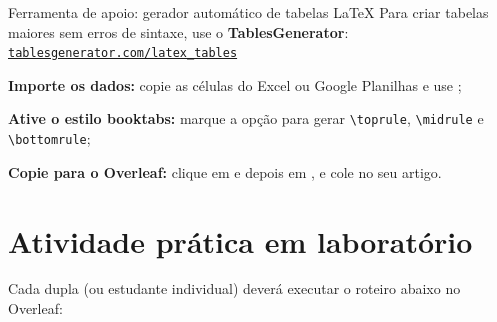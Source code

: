     \begin{dica}{Ferramenta de apoio: gerador automático de tabelas \LaTeX}
        Para criar tabelas maiores sem erros de sintaxe, use o \textbf{TablesGenerator}: \href{https://www.tablesgenerator.com/latex_tables}{\texttt{tablesgenerator.com/latex\_tables}}
        \begin{enumerate}[label={\protect\circulo[ambar]{\arabic*}}]
            \item \textbf{Importe os dados:} copie as células do Excel ou Google Planilhas e use \seta{};
            \item \textbf{Ative o estilo booktabs:} marque a opção  para gerar \texttt{\textbackslash toprule}, \texttt{\textbackslash midrule} e \texttt{\textbackslash bottomrule};
            \item \textbf{Copie para o Overleaf:} clique em  e depois em , e cole no seu artigo.
        \end{enumerate}
    \end{dica}

    \newpage
    \section{Atividade prática em laboratório}\label{sec:atividade}

    Cada dupla (ou estudante individual) deverá executar o roteiro abaixo no Overleaf:

